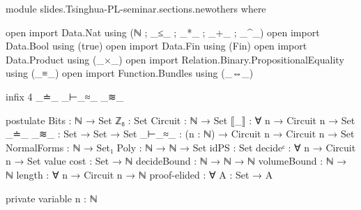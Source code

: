 \begin{code}[hide]
module slides.Tsinghua-PL-seminar.sections.newothers where

open import Data.Nat using (ℕ ; _≤_ ; _*_ ; _+_ ; _^_)
open import Data.Bool using (true)
open import Data.Fin using (Fin)
open import Data.Product using (_×_)
open import Relation.Binary.PropositionalEquality using (_≡_)
open import Function.Bundles using (_⇔_)

infix 4 _≐_ _⊢_≈_ _≋_

postulate
  Bits : ℕ → Set
  ℤ₈ : Set
  Circuit : ℕ → Set
  ⟦_⟧ : ∀ {n} → Circuit n → Set
  _≐_ _≋_ : Set → Set → Set
  _⊢_≈_ : (n : ℕ) → Circuit n → Circuit n → Set
  NormalForms : ℕ → Set₁
  Poly : ℕ → ℕ → Set
  idPS : Set
  decideᶜ : ∀ {n} → Circuit n → Set
  value cost : Set → ℕ
  decideBound : ℕ → ℕ → ℕ
  volumeBound : ℕ → ℕ
  length : ∀ {n} → Circuit n → ℕ
  proof-elided : ∀ {A : Set} → A

private variable
  n : ℕ
\end{code}

